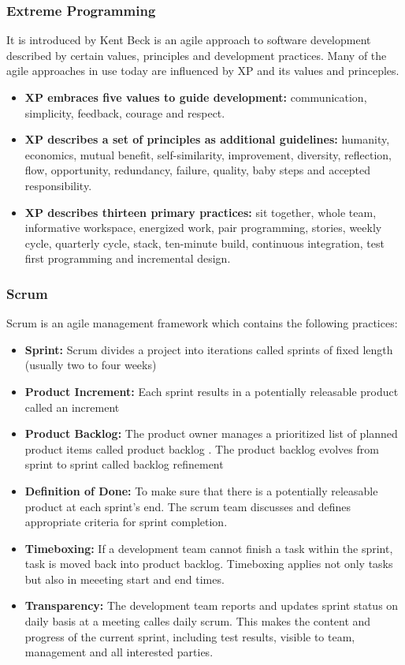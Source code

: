 \documentclass[12pt,a4paper,violet]{bbe}
\begin{document}
\subsubsection{Extreme Programming}
It is introduced by Kent Beck is an agile approach to software development described by certain values, principles and development practices. Many of the agile approaches in use today are influenced by XP and its values and princeples. \\
\begin{itemize}
    \item \textbf{XP embraces five values to guide development:} communication, simplicity, feedback, courage and respect.
    \item \textbf{XP describes  a set of principles as additional guidelines:} humanity, economics, mutual benefit,  self-similarity, improvement, diversity, reflection, flow, opportunity, redundancy, failure, quality, baby steps and accepted responsibility.
    \item \textbf{XP describes thirteen primary practices:} sit together, whole team, informative workspace, energized work, pair programming, stories, weekly cycle, quarterly cycle, stack, ten-minute build, continuous integration, test first programming and incremental design.
\end{itemize}
\subsubsection{Scrum}
Scrum is an agile management framework which contains the following practices:
\begin{remark}
    \begin{itemize}
    \item \textbf{Sprint:}  Scrum divides a project into iterations called sprints of fixed length (usually two to four weeks)
    \item \textbf{Product Increment:}  Each sprint results in a potentially releasable product called an increment 
    \item \textbf{Product Backlog:}  The product owner manages a prioritized list of planned product items called product backlog . The product backlog evolves from sprint to sprint called backlog refinement
    \item \textbf{Definition of Done:}  To make sure that there is a potentially releasable product at each sprint's end.  The scrum team discusses and defines appropriate criteria for sprint completion. 
    \item \textbf{Timeboxing:} If a development team cannot finish a task within the sprint, task is moved back into product backlog. Timeboxing applies not only tasks but also in meeeting start and end times.
    \item \textbf{Transparency:}  The development team reports and updates sprint status on daily basis at a meeting calles daily scrum. This makes the content and progress of the current sprint, including test results, visible to team, management and all interested parties.
    \end{itemize}
    \end{remark}
\end{document}
